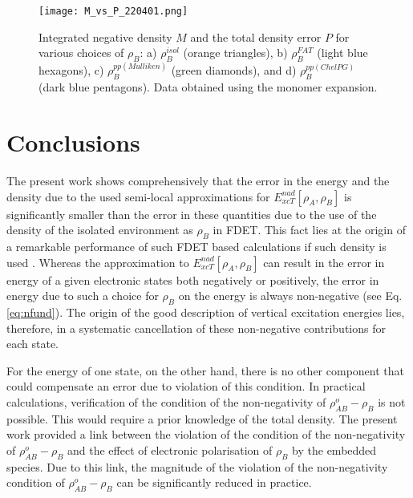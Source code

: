 \documentclass[journal=jctcce,manuscript=article]{achemso}
\begin{document}
\begin{figure}[H]
\centering
\texttt{[image: M\_vs\_P\_220401.png]}
\caption{Integrated negative density $M$ and the total density error $P$ for various choices of $\rho_B$:  a) $\rho_B^{isol}$ (orange triangles), b) $\rho_B^{FAT}$ (light blue hexagons), c) $\rho_B^{pp(Mulliken)}$ (green diamonds), and d) $\rho_B^{pp(ChelPG)}$ (dark blue pentagons). Data obtained using the monomer expansion.}
\label{fig:M_vs_P}
\end{figure}


\section{Conclusions}

The present work shows comprehensively that the error in the energy and the density due to the used semi-local approximations for 
${E}_{xcT}^{nad}[\rho_A,\rho_B]$ is significantly  smaller than the error in these quantities due to  the use of the density of the isolated environment as $\rho_B$ in FDET.
This fact lies at the origin of  a  remarkable performance of such FDET based calculations if such density is used  \cite{Ricardi2018}.
Whereas  the approximation  to ${E}_{xcT}^{nad}[\rho_A,\rho_B]$ can result in the error in energy of a given electronic states both negatively or positively, the error in energy due to  such a choice for $\rho_B$ on the energy 
is always non-negative (see Eq. \ref{eq:nfund}). The origin of the good description of vertical excitation energies lies, therefore, in a systematic cancellation of these non-negative contributions for each state.

For the energy of one state, on the other hand, there is no other component that could compensate an error due to violation of this condition. In practical calculations, verification  of the condition of the non-negativity of $\rho^{o}_{AB}-\rho_B$ is not possible. This would require a prior knowledge of the total density.
The present work provided a link between the violation of the condition of the non-negativity of $\rho^{o}_{AB}-\rho_B$
and the effect of electronic polarisation of $\rho_B$ by the embedded species. Due to this link, the magnitude
of the violation of the non-negativity condition of $\rho^{o}_{AB}-\rho_B$ can be significantly reduced  in practice.

%


\end{document}
